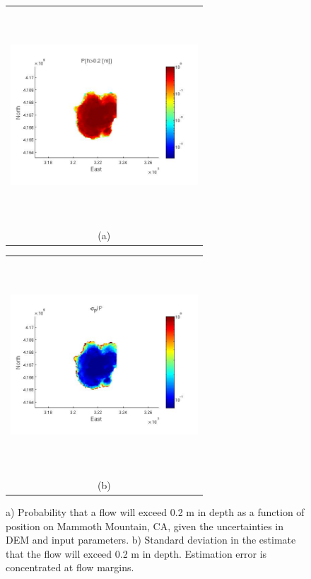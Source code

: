 \documentclass[a4paper,fleqn]{article}
\newcommand{\Pic}[2][0.85]{\begin{center}\texttt{[image: \#2]}
 \end{center} }
\begin{document}
\begin{figure}[H]
    \begin{minipage}[b]{0.6\textwidth}
        \begin{tabular}{c}
	\includegraphics[width=7cm,height=8cm,keepaspectratio]{fig1.jpg}\\
        (a)
        \end{tabular}
    \end{minipage}
    \begin{minipage}{0.6\textwidth}
        \begin{tabular}{c}
	\includegraphics[width=7cm,height=8cm,keepaspectratio]{fig2.jpg}\\
        (b)
        \end{tabular}
    \end{minipage} 
\caption{a) Probability that a flow will exceed 0.2 m in depth as a function of position on Mammoth Mountain, CA, given the uncertainties in DEM and input parameters.
b) Standard deviation in the estimate that the flow will exceed 0.2 m in depth. Estimation error is concentrated at flow margins.}
\label{fig3}  
\end{figure}
\end{document}
